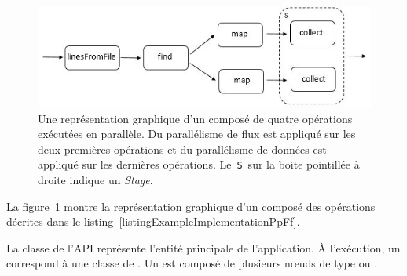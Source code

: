 


\begin{figure}
\centering
     \includegraphics[width=\textwidth]{Figures/ExempleRuntimeExecution.jpg}
      \caption[Une repr\'esentation graphique d'un  compos\'e de quatre op\'erations.]{Une repr\'esentation graphique d'un  compos\'e de quatre op\'erations ex\'ecut\'ees en parall\`ele. Du parall\'elisme de flux est appliqu\'e sur les deux premi\`eres op\'erations et du parall\'elisme de donn\'ees est appliqu\'e sur les derni\`eres op\'erations. Le~\texttt{S}~sur la boite pointill\'ee \`a droite indique un \emph{Stage}.}
       \label{ExempleRuntimeExecution.fig}
\end{figure}



La figure~\ref{ExempleRuntimeExecution.fig} montre la repr\'esentation graphique d'un  compos\'e des op\'erations d\'ecrites dans le listing~\ref{listingExampleImplementationPpFf}.
 

La classe  de l'API repr\'esente l'entit\'e principale de l'application. \`A l'ex\'ecution, un  correspond \`a une classe  de . Un  est compos\'e de plusieurs nœuds de type  ou . 

